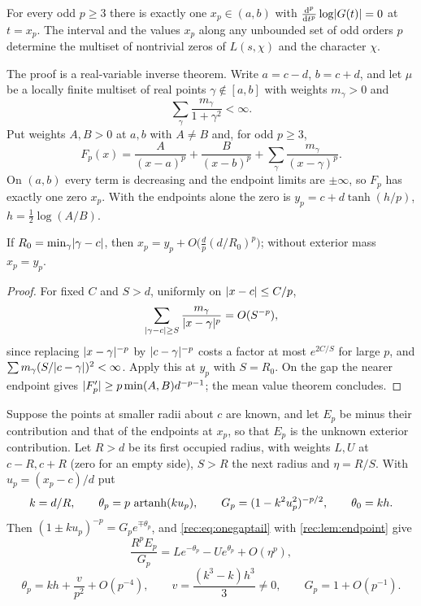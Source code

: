 \begin{theorem}\label{rec:thm:oneinterval}
For every odd $p\ge3$ there is exactly one $x_p\in(a,b)$ with
$\frac{\mathrm{d}^p}{\mathrm{d} t^p}\log\lvert G(t)\rvert=0$ at $t=x_p$. The interval and the values $x_p$ along any
unbounded set of odd orders $p$ determine the multiset of nontrivial zeros of $L(s,\chi)$ and
the character $\chi$.
\end{theorem}

The proof is a real-variable inverse theorem. Write $a=c-d$, $b=c+d$, and let $\mu$ be a locally
finite multiset of real points $\gamma\notin[a,b]$ with weights $m_\gamma>0$ and
\begin{equation}\label{rec:eq:onegapsum}
 \sum_\gamma\frac{m_\gamma}{1+\gamma^2}<\infty .
\end{equation}
Put weights $A,B>0$ at $a,b$ with $A\ne B$ and, for odd $p\ge3$,
\[
 F_p(x)=\frac A{(x-a)^p}+\frac B{(x-b)^p}+\sum_\gamma\frac{m_\gamma}{(x-\gamma)^p}.
\]
On $(a,b)$ every term is decreasing and the endpoint limits are $\pm\infty$, so $F_p$ has exactly
one zero $x_p$. With the endpoints alone the zero is $y_p=c+d\tanh(h/p)$, $h=\tfrac12\log(A/B)$.

\begin{lemma}\label{rec:lem:endpoint}
If $R_0=\min_\gamma\lvert\gamma-c\rvert$, then $x_p=y_p+O\bigl(\tfrac dp(d/R_0)^p\bigr)$; without exterior
mass $x_p=y_p$.
\end{lemma}

\begin{proof}
For fixed $C$ and $S>d$, uniformly on $\lvert x-c\rvert\le C/p$,
\begin{equation}\label{rec:eq:onegaptail}
 \sum_{\lvert\gamma-c\rvert\ge S}\frac{m_\gamma}{\lvert x-\gamma\rvert^p}=O(S^{-p}),
\end{equation}
since replacing $\lvert x-\gamma\rvert^{-p}$ by $\lvert c-\gamma\rvert^{-p}$ costs a factor at most $e^{2C/S}$ for
large $p$, and $\sum m_\gamma(S/\lvert c-\gamma\rvert)^2<\infty$. Apply this at $y_p$ with $S=R_0$. On the
gap the nearer endpoint gives $\lvert F_p'\rvert\ge p\min(A,B)d^{-p-1}$; the mean value theorem concludes.
\end{proof}

Suppose the points at smaller radii about $c$ are known, and let $E_p$ be minus their
contribution and that of the endpoints at $x_p$, so that $E_p$ is the unknown exterior
contribution. Let $R>d$ be its first occupied radius, with weights $L,U$ at $c-R,c+R$ (zero for
an empty side), $S>R$ the next radius and $\eta=R/S$. With $u_p=(x_p-c)/d$ put
\[
 k=d/R,\qquad \theta_p=p\,\operatorname{artanh}(ku_p),\qquad G_p=(1-k^2u_p^2)^{-p/2},\qquad\theta_0=kh .
\]
Then $(1\pm ku_p)^{-p}=G_pe^{\mp\theta_p}$, and \eqref{rec:eq:onegaptail} with
\cref{rec:lem:endpoint} give
\begin{equation}\label{rec:eq:shell}
 \frac{R^pE_p}{G_p}=Le^{-\theta_p}-Ue^{\theta_p}+O(\eta^p),
\end{equation}
\[
 \theta_p=kh+\frac v{p^2}+O(p^{-4}),\qquad v=\frac{(k^3-k)h^3}3\ne0,\qquad G_p=1+O(p^{-1}).
\]

